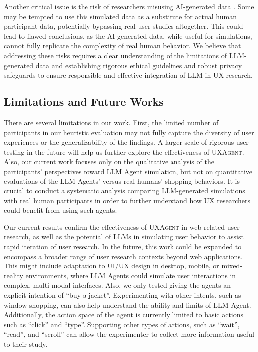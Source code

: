 \documentclass[manuscript,review,anonymous]{acmart}
\DeclareRobustCommand{\projectname}{\textsc{UXAgent}\xspace}
\begin{document}
Another critical issue is the risk of researchers misusing AI-generated data \cite{perisPrivacyTimeLanguage2023}. 
Some may be tempted to use this simulated data as a substitute for actual human participant data, potentially bypassing real user studies altogether. 
This could lead to flawed conclusions, as the AI-generated data, while useful for simulations, cannot fully replicate the complexity of real human behavior.
We believe that addressing these risks requires a clear understanding of the limitations of LLM-generated data and establishing rigorous ethical guidelines and robust privacy safeguards to ensure responsible and effective integration of LLM in UX research.


\subsection{Limitations and Future Works}
There are several limitations in our work. 
First, the limited number of participants in our heuristic evaluation may not fully capture the diversity of user experiences or the generalizability of the findings. 
A larger scale of rigorous user testing in the future will help us further explore the effectiveness of \projectname.
Also, our current work focuses only on the qualitative analysis of the participants' perspectives toward LLM Agent simulation, but not on quantitative evaluations of the LLM Agents' versus real humans' shopping behaviors. 
It is crucial to conduct a systematic analysis comparing LLM-generated simulations with real human participants in order to further understand how UX researchers could benefit from using such agents.

Our current results confirm the effectiveness of \projectname in web-related user research, as well as the potential of LLMs in simulating user behavior to assist rapid iteration of user research. 
In the future, this work could be expanded to encompass a broader range of user research contexts beyond web applications. 
This might include adaptation to UI/UX design in desktop, mobile, or mixed-reality environments, where LLM Agents could simulate user interactions in complex, multi-modal interfaces. 
Also, we only tested giving the agents an explicit intention of ``buy a jacket''. Experimenting with other intents, such as window shopping, can also help understand the ability and limits of LLM Agent.
Additionally, the action space of the agent is currently limited to basic actions such as ``click'' and ``type''. Supporting other types of actions, such as ``wait'', ``read'', and ``scroll'' can allow the experimenter to collect more information useful to their study.
\end{document}
